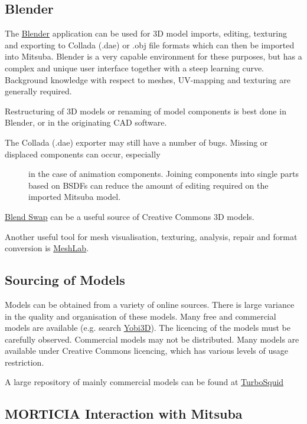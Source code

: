 \subsection{Blender}\label{blender}

The \href{https://www.blender.org/}{Blender} application can be used for
3D model imports, editing, texturing and exporting to Collada (.dae) or
.obj file formats which can then be imported into Mitsuba. Blender is a
very capable environment for these purposes, but has a complex and
unique user interface together with a steep learning curve. Background
knowledge with respect to meshes, UV-mapping and texturing are generally
required.

Restructuring of 3D models or renaming of model components is best done
in Blender, or in the originating CAD software.

\begin{description}
\item[The Collada (.dae) exporter may still have a number of bugs.
Missing or displaced components can occur, especially]
in the case of animation components. Joining components into single
parts based on BSDFs can reduce the amount of editing required on the
imported Mitsuba model.
\end{description}

\href{http://www.blendswap.com/}{Blend Swap} can be a useful source of
Creative Commons 3D models.

Another useful tool for mesh visualisation, texturing, analysis, repair
and format conversion is \href{http://www.meshlab.net/}{MeshLab}.

\subsection{Sourcing of Models}\label{sourcing-of-models}

Models can be obtained from a variety of online sources. There is large
variance in the quality and organisation of these models. Many free and
commercial models are available (e.g. search
\href{http://www.yobi3d.com/}{Yobi3D}). The licencing of the models must
be carefully observed. Commercial models may not be distributed. Many
models are available under Creative Commons licencing, which has various
levels of usage restriction.

A large repository of mainly commercial models can be found at
\href{https://www.turbosquid.com/}{TurboSquid}

\subsection{MORTICIA Interaction with
Mitsuba}\label{morticia-interaction-with-mitsuba}


